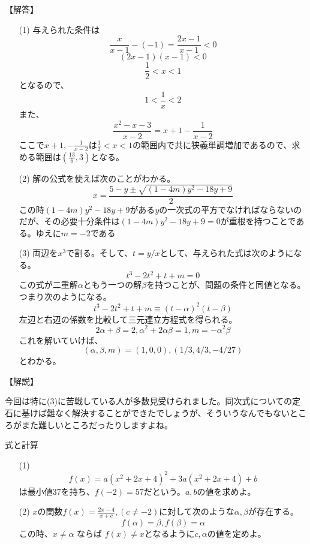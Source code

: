 \documentclass[a4paper,fleqn,dvipdfmx]{jsarticle}
\begin{document}
\begin{flushleft}
【解答】
\end{flushleft}

\begin{itemize}
    \item [(1)] 与えられた条件は
    $$\frac{x}{x-1}-(-1)=\frac{2x-1}{x-1}<0$$
    $$(2x-1)(x-1)<0$$
    $$\frac{1}{2}<x<1$$
    となるので、
    $$1<\frac{1}{x}<2$$
    また、
    $$\frac{x^2-x-3}{x-2}=x+1-\frac{1}{x-2}$$
    ここで$x+1,-\frac{1}{x-2}$は$\frac{1}{2}<x<1$の範囲内で共に狭義単調増加であるので、求める範囲は$(\frac{13}{6},3)$となる。
    \item [(2)] 解の公式を使えば次のことがわかる。$$x=\frac{5-y\pm \sqrt{(1-4m)y^2-18y+9}}{2}$$
    この時$(1-4m)y^2-18y+9$がある$y$の一次式の平方でなければならないのだが、その必要十分条件は$(1-4m)y^2-18y+9=0$が重根を持つことである。ゆえに$m=-2$である
    \item [(3)] 両辺を$x^3$で割る。そして、$t=y/x$として、与えられた式は次のようになる。$$t^3-2t^2+t+m=0$$この式が二重解$\alpha$ともう一つの解$\beta$を持つことが、問題の条件と同値となる。つまり次のようになる。$$t^3-2t^2+t+m\equiv (t-\alpha)^2(t-\beta)$$左辺と右辺の係数を比較して三元連立方程式を得られる。
    $$2\alpha+\beta=2,\alpha^2+2\alpha\beta=1,m=-\alpha^2\beta$$
    これを解いていけば、$$(\alpha,\beta,m)=(1,0,0),(1/3,4/3,-4/27)$$とわかる。
    
\end{itemize}

\begin{flushleft}
    【解説】
\end{flushleft}

今回は特に(3)に苦戦している人が多数見受けられました。同次式についての定石に基けば難なく解決することができたでしょうが、そういうなんでもないところがまた難しいところだったりしますよね。



\newpage
\begin{itembox}[l]{式と計算}
\begin{itemize}
    \item [(1)] $$f(x)=a(x^2+2x+4)^2+3a(x^2+2x+4)+b$$は最小値37を持ち、$f(-2)=57$だという。$a,b$の値を求めよ。
    \item [(2)] $x$の関数$f(x)=\displaystyle\frac{2x-4}{x+c},(c\neq -2)$に対して次のような$\alpha,\beta$が存在する。
    $$f(\alpha)=\beta,f(\beta)=\alpha$$
    この時、$x \neq \alpha$ ならば $f(x) \neq x$となるように$c,\alpha$の値を定めよ。
\end{itemize}
\end{itembox}
\end{document}
